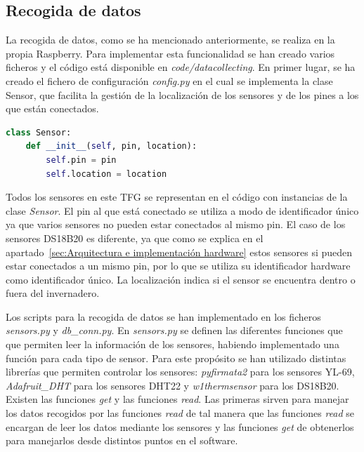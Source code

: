 \documentclass[a4paper, 12pt, oneside]{book}
\begin{document}
\subsection{Recogida de datos}
\label{subsec:recogida de datos}
La recogida de datos, como se ha mencionado anteriormente, se realiza en la propia Raspberry. Para implementar esta funcionalidad se han creado varios ficheros y el código está disponible en \textit{code/datacollecting}. En primer lugar, se ha creado el fichero de configuración \textit{config.py} en el cual se implementa la clase Sensor, que facilita la gestión de la localización de los sensores y de los pines a los que están conectados.

\begin{lstlisting}[language=Python]
class Sensor:
    def __init__(self, pin, location):
        self.pin = pin
        self.location = location
\end{lstlisting}

Todos los sensores en este TFG se representan en el código con instancias de la clase \textit{Sensor}. El pin al que está conectado se utiliza a modo de identificador único ya que varios sensores no pueden estar conectados al mismo pin. El caso de los sensores DS18B20 es diferente, ya que como se explica en el apartado~\ref{sec:Arquitectura e implementación hardware} estos sensores si pueden estar conectados a un mismo pin, por lo que se utiliza su identificador hardware como identificador único. La localización indica si el sensor se encuentra dentro o fuera del invernadero.

Los scripts para la recogida de datos se han implementado en los ficheros \textit{sensors.py} y \textit{db\_conn.py}. En \textit{sensors.py} se definen las diferentes funciones que que permiten leer la información de los sensores, habiendo implementado una función para cada tipo de sensor. Para este propósito se han utilizado distintas librerías que permiten controlar los sensores: \textit{pyfirmata2} para los sensores YL-69, \textit{Adafruit\_DHT} para los sensores DHT22 y \textit{w1thermsensor} para los DS18B20.
Existen las funciones \textit{get} y las funciones \textit{read}. Las primeras sirven para manejar los datos recogidos por las funciones \textit{read} de tal manera que las funciones \textit{read} se encargan de leer los datos mediante los sensores y las funciones \textit{get} de obtenerlos para manejarlos desde distintos puntos en el software.
\end{document}
